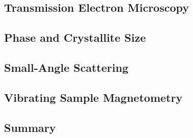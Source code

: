\documentclass[\main/dresen_thesis.tex]{subfiles}
\renewcommand{\thisPath}{\main/chapters/looselyPackedNS/nanoparticles/}
\begin{document}

  \subsection{Transmission Electron Microscopy}
    
      \FloatBarrier

  \subsection{Phase and Crystallite Size}
    
      \FloatBarrier

  \subsection{Small-Angle Scattering}
    
      \FloatBarrier

  \subsection{Vibrating Sample Magnetometry}
    
      \FloatBarrier

  \clearpage
  \subsection{Summary}
    
      \FloatBarrier
\end{document}
